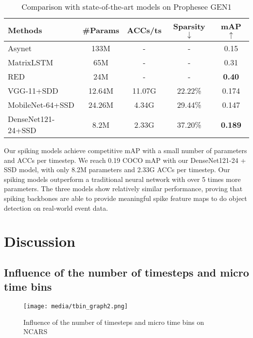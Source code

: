 \documentclass[conference]{IEEEtran}
\begin{document}
\begin{table}[]
\renewcommand{\arraystretch}{1.3}
\centering
\caption{Comparison with state-of-the-art models on Prophesee GEN1}
\begin{tabular}{lcccc}
\hline
\textbf{Methods}  &  \textbf{\#Params}  & \textbf{ACCs/ts}   & \textbf{Sparsity $\downarrow$} & \textbf{mAP $\uparrow$}   \\ \hline
Asynet \cite{asynet}      & 133M     & - & - & 0.15                       \\
MatrixLSTM \cite{matrixlstm}   & 65M    & - & -   & 0.31                   \\
RED \cite{1mpx} & 24M      & - & -     &   \textbf{0.40}          \\
\hline
VGG-11+SDD &  12.64M  & 11.07G & 22.22\%   & 0.174                       \\ 
MobileNet-64+SSD &  24.26M  & 4.34G & 29.44\%    & 0.147                       \\ 
DenseNet121-24+SSD  & 8.2M & 2.33G & 37.20\%     & \textbf{0.189}                       \\ 

\hline
\end{tabular}
\label{tab:gen1}
\end{table}

Our spiking models achieve competitive mAP with a small number of parameters and ACCs per timestep. We reach 0.19 COCO mAP with our DenseNet121-24 + SSD model, with only 8.2M parameters and 2.33G ACCs per timestep. Our spiking models outperform a traditional neural network with over 5 times more parameters. The three models show relatively similar performance, proving that spiking backbones are able to provide meaningful spike feature maps to do object detection on real-world event data. 

\section{Discussion}

\subsection{Influence of the number of timesteps and micro time bins\label{tbin}}


\begin{figure}[tb]
\centerline{\texttt{[image: media/tbin\_graph2.png]}}
\caption{Influence of the number of timesteps and micro time bins on NCARS}
\label{fig:tbin}
\end{figure}
\end{document}
